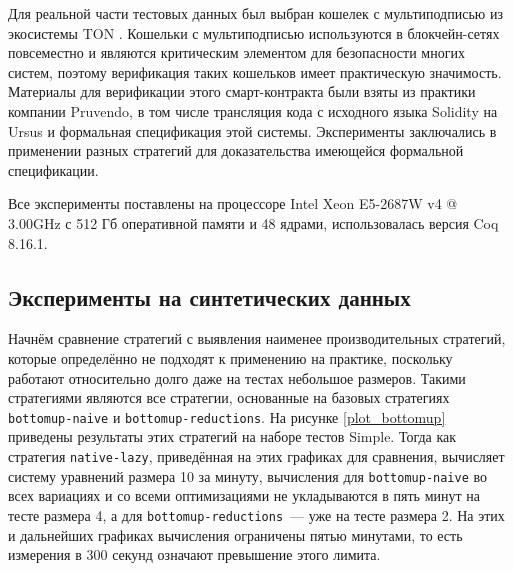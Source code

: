 \documentclass[../diploma.tex]{subfiles}
\begin{document}
Для реальной части тестовых данных был выбран кошелек с мультиподписью из экосистемы TON \cite{multisig}. Кошельки с мультиподписью используются в блокчейн-сетях повсеместно \cite{wallets_survey} и являются критическим элементом для безопасности многих систем, поэтому верификация таких кошельков имеет практическую значимость. Материалы для верификации этого смарт-контракта были взяты из практики компании Pruvendo, в том числе трансляция кода с исходного языка Solidity на Ursus и формальная спецификация этой системы. Эксперименты заключались в применении разных стратегий для доказательства имеющейся формальной спецификации.

Все эксперименты поставлены на процессоре Intel Xeon E5-2687W v4 @ 3.00GHz с 512 Гб оперативной памяти и 48 ядрами, использовалась версия Coq 8.16.1.

\subsection{Эксперименты на синтетических данных}

Начнём сравнение стратегий с выявления наименее производительных стратегий, которые определённо не подходят к применению на практике, поскольку работают относительно долго даже на тестах небольшое размеров. Такими стратегиями являются все стратегии, основанные на базовых стратегиях \texttt{bottomup-naive} и \texttt{bottomup-reductions}. На рисунке \ref{plot_bottomup} приведены результаты этих стратегий на наборе тестов Simple. Тогда как стратегия \texttt{native-lazy}, приведённая на этих графиках для сравнения, вычисляет систему уравнений размера 10 за минуту, вычисления для \texttt{bottomup-naive} во всех вариациях и со всеми оптимизациями не укладываются в пять минут на тесте размера 4, а для \texttt{bottomup-reductions}~--- уже на тесте размера 2. На этих и дальнейших графиках вычисления ограничены пятью минутами, то есть измерения в 300 секунд означают превышение этого лимита. 

\graphicspath{ {../images/} }
\end{document}
